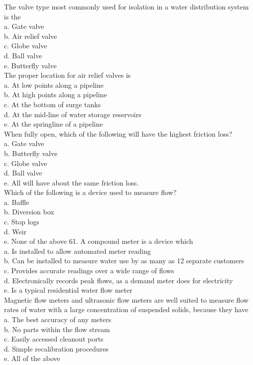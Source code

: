 The valve type most commonly used for isolation in a water distribution system is the\\
a. Gate valve\\
b. Air relief valve\\
c. Globe valve\\
d. Ball valve\\
e. Butterfly valve\\

The proper location for air relief valves is\\
a. At low points along a pipeline\\
b. At high points along a pipeline\\
c. At the bottom of surge tanks\\
d. At the mid-line of water storage reservoirs\\
e. At the springline of a pipeline\\

When fully open, which of the following will have the highest friction loss?\\
a. Gate valve\\
b. Butterfly valve\\
c. Globe valve\\
d. Ball valve\\
e. All will have about the same friction loss.\\

Which of the following is a device used to measure flow?\\
a. Baffle\\
b. Diversion box\\
c. Stop logs\\
d. Weir\\
e. None of the above 61. A compound meter is a device which\\
a. Is installed to allow automated meter reading\\
b. Can be installed to measure water use by as many as 12 separate customers\\
c. Provides accurate readings over a wide range of flows\\
d. Electronically records peak flows, as a demand meter does for electricity\\
e. Is a typical residential water flow meter\\

Magnetic flow meters and ultrasonic flow meters are well suited to measure flow rates of water with a large concentration of suspended solids, because they have\\
a. The best accuracy of any meters\\
b. No parts within the flow stream\\
c. Easily accessed cleanout ports\\
d. Simple recalibration procedures\\
e. All of the above\\

